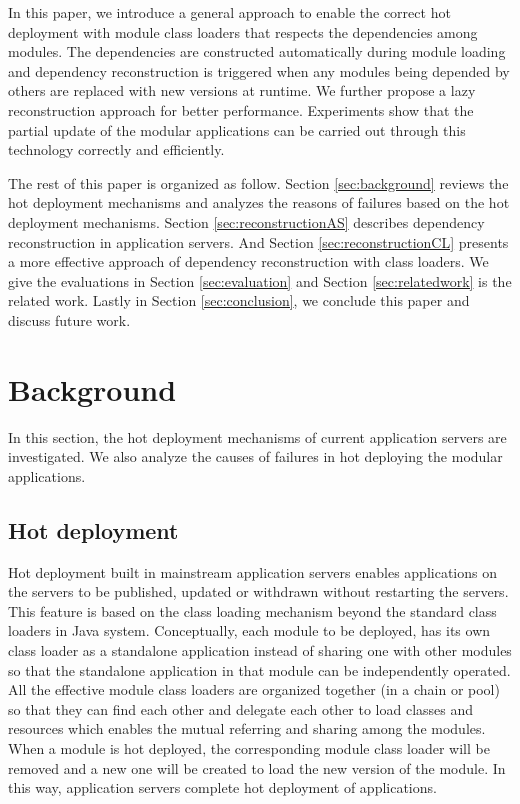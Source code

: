 \documentclass[conference]{IEEEtran}
\begin{document}
In this paper, we introduce a general approach to enable the correct hot deployment  with module class loaders that respects the dependencies among modules. The dependencies are constructed automatically during module loading and dependency reconstruction is triggered when any modules being depended by others are replaced with new versions at runtime. We further propose a lazy reconstruction approach for better performance. Experiments show that the partial update of the modular applications can be carried out through this technology correctly and efficiently.

The rest of this paper is organized as follow. 
Section \ref{sec:background} reviews the hot deployment mechanisms and analyzes the reasons of failures based on the hot deployment mechanisms. Section \ref{sec:reconstructionAS} describes dependency reconstruction in application servers. And Section \ref{sec:reconstructionCL} presents a more effective approach of dependency reconstruction with class loaders.
We give the evaluations in Section \ref{sec:evaluation} and Section \ref{sec:relatedwork} is the related work. Lastly in Section \ref{sec:conclusion}, we conclude this paper and discuss future work.



\section{Background\label{sec:background}}
In this section, the hot deployment mechanisms of current application servers are investigated. We also analyze the causes of failures in hot deploying the modular applications.

\subsection{Hot deployment}

Hot deployment built in mainstream application servers enables applications on the servers to be published, updated or withdrawn without restarting the servers. This feature is based on the class loading mechanism beyond the standard class loaders\cite{standard_cl} in Java system. Conceptually, each module to be deployed, has its own class loader as a standalone application instead of sharing one with other modules so that the standalone application in that module can be independently operated. All the effective module class loaders are organized together (in a chain or pool) so that they can find each other and delegate each other to load classes and resources which enables the mutual referring and sharing among the modules. When a module is hot deployed, the corresponding module class loader will be removed and a new one will be created to load the new version of the module. In this way, application servers complete hot deployment of applications\cite{module_cl}.
\end{document}
